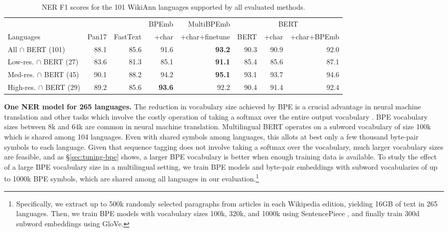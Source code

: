 \documentclass[11pt,a4paper]{article}
\newcommand\secref[1]{\S\ref{#1}}
\begin{document}
\begin{table*}[t!]
	\centering
	\small
	\begin{adjustbox}{max width=\linewidth}
		\begin{tabular}{lrr|rr|rrr}
\toprule

 & & & BPEmb & MultiBPEmb & \multicolumn{3}{|c}{BERT} \\
Languages & Pan17 & FastText & +char & +char+finetune & BERT & +char & +char+BPEmb \\

\midrule
All $\cap$ BERT (101) & 88.1 & 85.6 & 91.6 & \textbf{93.2} & 90.3 & 90.9 & 92.0\\
Low-res. $\cap$ BERT (27) & 83.6 & 81.3 & 85.1 & \textbf{91.1} & 85.4 & 85.6 & 87.1\\
Med-res. $\cap$ BERT (45) & 90.1 & 88.2 & 94.2 & \textbf{95.1} & 93.1 & 93.7 & 94.6\\
High-res. $\cap$ BERT (29) & 89.2 & 85.6 & \textbf{93.6} & 92.2 & 90.4 & 91.4 & 92.4\\
\bottomrule
\end{tabular}
 	\end{adjustbox}
	\caption{NER F1 scores for the 101 WikiAnn languages supported by all evaluated methods.}
	\label{tbl:wikiann-results-bert}
\end{table*}

\noindent\textbf{One NER model for 265 languages.} The reduction in vocabulary size achieved by BPE is a crucial advantage in neural machine translation \citep{johnson2017googles} and other tasks which involve the costly operation of taking a softmax over the entire output vocabulary \citep[see][]{morin2005hierarchical,li2019efficient}.
BPE vocabulary sizes between 8k and 64k are common in neural machine translation.
Multilingual BERT operates on a subword vocabulary of size 100k which is shared among 104 languages. Even with shared symbols among languages, this allots at best only a few thousand byte-pair symbols to each language.
Given that sequence tagging does not involve taking a softmax over the vocabulary, much larger vocabulary sizes are feasible, and as \secref{sec:tuning-bpe} shows, a larger BPE vocabulary is better when enough training data is available.
To study the effect of a large BPE vocabulary size in a multilingual setting, we train BPE models and byte-pair embeddings with subword vocabularies of up to 1000k BPE symbols, which are shared among all languages in our evaluation.\footnote{Specifically, we extract up to 500k randomly selected paragraphs from articles in each Wikipedia edition, yielding 16GB of text in 265 languages.
	Then, we train BPE models with vocabulary sizes 100k, 320k, and 1000k using SentencePiece \citep{kudo2018sentencepiece}, and finally train 300d subword embeddings using GloVe.}
\end{document}

